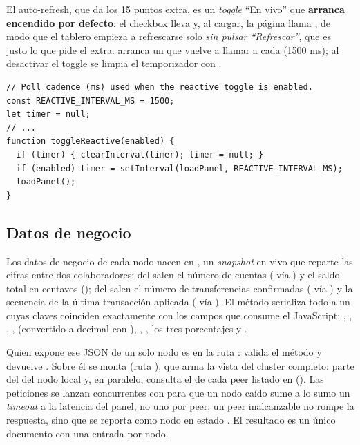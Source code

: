 El auto-refresh, que da los 15 puntos extra, es un \emph{toggle} ``En vivo'' que
\textbf{arranca encendido por defecto}: el checkbox lleva  y, al
cargar, la página llama , de modo que el
tablero empieza a refrescarse solo \emph{sin pulsar ``Refrescar''}, que es justo lo
que pide el extra.  arranca un  que
vuelve a llamar a  cada 
(1500 ms); al desactivar el toggle se limpia el temporizador con
.

\begin{lstlisting}[language=none,caption={Polling automatico del dashboard (dashboard.html)}]
// Poll cadence (ms) used when the reactive toggle is enabled.
const REACTIVE_INTERVAL_MS = 1500;
let timer = null;
// ...
function toggleReactive(enabled) {
  if (timer) { clearInterval(timer); timer = null; }
  if (enabled) timer = setInterval(loadPanel, REACTIVE_INTERVAL_MS);
  loadPanel();
}
\end{lstlisting}

\subsection{Datos de negocio}

Los datos de negocio de cada nodo nacen en , un
\emph{snapshot} en vivo que reparte las cifras entre dos colaboradores: del
 salen el número de cuentas ( vía
) y el saldo total en centavos (); del
 salen el número de transferencias confirmadas
( vía ) y la secuencia de la
última transacción aplicada ( vía ). El
método  serializa todo a un  cuyas claves
coinciden exactamente con los campos que consume el JavaScript: ,
, , , 
(convertido a decimal con ), ,
, los tres porcentajes y .

Quien expone ese JSON de un solo nodo es  en la
ruta : valida el método y devuelve
. Sobre él se monta
 (ruta ), que arma la vista del
cluster completo: parte del  del nodo local y, en paralelo,
consulta el  de cada peer listado en 
(). Las peticiones se lanzan concurrentes con
 para que un nodo caído sume a lo sumo un \emph{timeout}
a la latencia del panel, no uno por peer; un peer inalcanzable no rompe la
respuesta, sino que se reporta como nodo en estado . El resultado es
un único documento  con una entrada por nodo.

